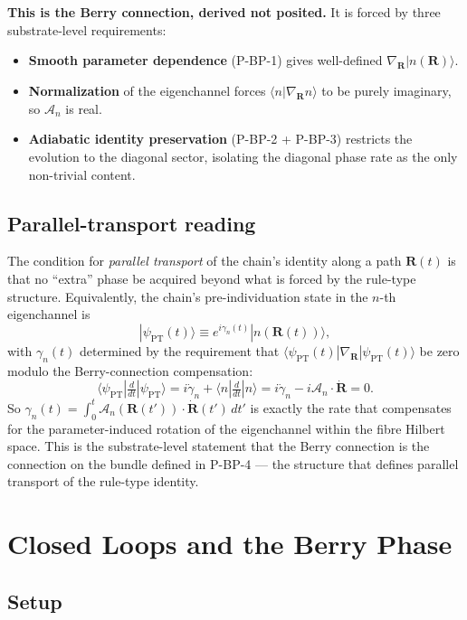 \documentclass[11pt,a4paper]{article}
\begin{document}
\textbf{This is the Berry connection, derived not posited.} It is forced by three substrate-level requirements:

\begin{itemize}[noitemsep]
  \item \textbf{Smooth parameter dependence} (P-BP-1) gives well-defined $\nabla_\mathbf{R}|n(\mathbf{R})\rangle$.
  \item \textbf{Normalization} of the eigenchannel forces $\langle n|\nabla_\mathbf{R} n\rangle$ to be purely imaginary, so $\mathcal{A}_n$ is real.
  \item \textbf{Adiabatic identity preservation} (P-BP-2 + P-BP-3) restricts the evolution to the diagonal sector, isolating the diagonal phase rate as the only non-trivial content.
\end{itemize}

\subsection{Parallel-transport reading}

The condition for \emph{parallel transport} of the chain's identity along a path $\mathbf{R}(t)$ is that no ``extra'' phase be acquired beyond what is forced by the rule-type structure. Equivalently, the chain's pre-individuation state in the $n$-th eigenchannel is
\[
|\psi_\mathrm{PT}(t)\rangle \equiv e^{i\gamma_n(t)} |n(\mathbf{R}(t))\rangle,
\]
with $\gamma_n(t)$ determined by the requirement that $\langle\psi_\mathrm{PT}(t)|\nabla_\mathbf{R}|\psi_\mathrm{PT}(t)\rangle$ be zero modulo the Berry-connection compensation:
\[
\langle \psi_\mathrm{PT}|\tfrac{d}{dt}|\psi_\mathrm{PT}\rangle = i\dot\gamma_n + \langle n|\tfrac{d}{dt}|n\rangle = i\dot\gamma_n - i\mathcal{A}_n \cdot \dot{\mathbf{R}} = 0.
\]
So $\gamma_n(t) = \int_0^t \mathcal{A}_n(\mathbf{R}(t'))\cdot\dot{\mathbf{R}}(t')\,dt'$ is exactly the rate that compensates for the parameter-induced rotation of the eigenchannel within the fibre Hilbert space. This is the substrate-level statement that the Berry connection is the connection on the bundle defined in P-BP-4 --- the structure that defines parallel transport of the rule-type identity.

\section{Closed Loops and the Berry Phase}

\subsection{Setup}
\end{document}

